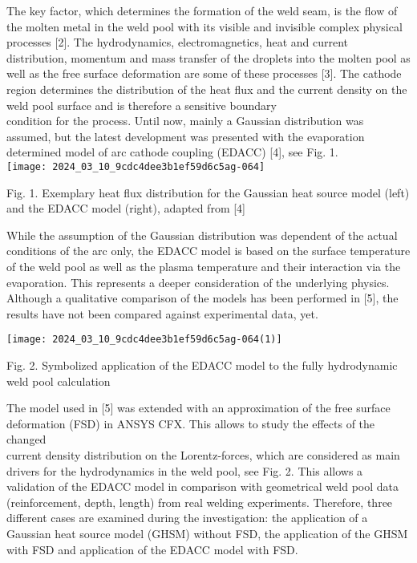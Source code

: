 \documentclass[10pt]{article}
\begin{document}
The key factor, which determines the formation of the weld seam, is the flow of the molten metal in the weld pool with its visible and invisible complex physical processes [2]. The hydrodynamics, electromagnetics, heat and current distribution, momentum and mass transfer of the droplets into the molten pool as well as the free surface deformation are some of these processes [3]. The cathode region determines the distribution of the heat flux and the current density on the weld pool surface and is therefore a sensitive boundary\\
condition for the process. Until now, mainly a Gaussian distribution was assumed, but the latest development was presented with the evaporation determined model of arc cathode coupling (EDACC) [4], see Fig. 1.\\
\texttt{[image: 2024\_03\_10\_9cdc4dee3b1ef59d6c5ag-064]}

Fig. 1. Exemplary heat flux distribution for the Gaussian heat source model (left) and the EDACC model (right), adapted from [4]

While the assumption of the Gaussian distribution was dependent of the actual conditions of the arc only, the EDACC model is based on the surface temperature of the weld pool as well as the plasma temperature and their interaction via the evaporation. This represents a deeper consideration of the underlying physics. Although a qualitative comparison of the models has been performed in [5], the results have not been compared against experimental data, yet.

\begin{center}
\texttt{[image: 2024\_03\_10\_9cdc4dee3b1ef59d6c5ag-064(1)]}
\end{center}

Fig. 2. Symbolized application of the EDACC model to the fully hydrodynamic weld pool calculation

The model used in [5] was extended with an approximation of the free surface deformation (FSD) in ANSYS CFX. This allows to study the effects of the changed\\
current density distribution on the Lorentz-forces, which are considered as main drivers for the hydrodynamics in the weld pool, see Fig. 2. This allows a validation of the EDACC model in comparison with geometrical weld pool data (reinforcement, depth, length) from real welding experiments. Therefore, three different cases are examined during the investigation: the application of a Gaussian heat source model (GHSM) without FSD, the application of the GHSM with FSD and application of the EDACC model with FSD.
\end{document}
